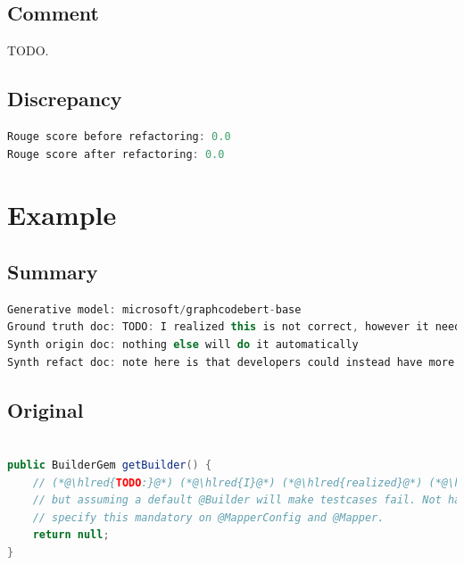 \documentclass[usenames,dvipsnames]{article} %
\DeclareRobustCommand{\hlred}[1]{{\sethlcolor{pink}\hl{#1}}}
\begin{document}
\subsection{Comment}

TODO.

\subsection{Discrepancy}

\begin{lstlisting}[language=java]
Rouge score before refactoring: 0.0
Rouge score after refactoring: 0.0
\end{lstlisting}



\pagebreak
\section{Example}
\subsection{Summary}

\begin{lstlisting}[language=java]
Generative model: microsoft/graphcodebert-base
Ground truth doc: TODO: I realized this is not correct, however it needs to be null in order to keep downward compatibility
Synth origin doc: nothing else will do it automatically
Synth refact doc: note here is that developers could instead have more information that should not need builder information and should also
\end{lstlisting}

\subsection{Original}
\begin{lstlisting}[language=java]

public BuilderGem getBuilder() {
    // (*@\hlred{TODO:}@*) (*@\hlred{I}@*) (*@\hlred{realized}@*) (*@\hlred{this}@*) (*@\hlred{is not correct, however }@*)it (*@\hlred{needs to be null in order to keep downward compatibility}@*)
    // but assuming a default @Builder will make testcases fail. Not having a default means that you need to
    // specify this mandatory on @MapperConfig and @Mapper.
    return null;
}
\end{lstlisting}
\end{document}
